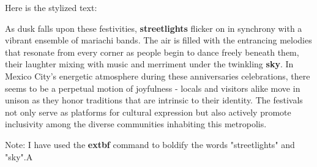 \documentclass[12pt, a4paper]{article}
\begin{document}
Here is the stylized text:

As dusk falls upon these festivities, \textbf{streetlights} flicker on in synchrony with a vibrant ensemble of mariachi bands. The air is filled with the entrancing melodies that resonate from every corner as people begin to dance freely beneath them, their laughter mixing with music and merriment under the twinkling \textbf{sky}. In Mexico City's energetic atmosphere during these anniversaries celebrations, there seems to be a perpetual motion of joyfulness - locals and visitors alike move in unison as they honor traditions that are intrinsic to their identity. The festivals not only serve as platforms for cultural expression but also actively promote inclusivity among the diverse communities inhabiting this metropolis.

Note: I have used the \textbf{extbf} command to boldify the words "streetlights" and "sky".A
\end{document}

